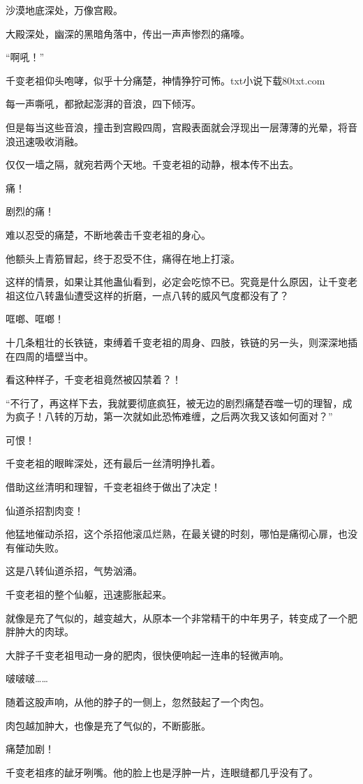 \begin{this_body}
沙漠地底深处，万像宫殿。

大殿深处，幽深的黑暗角落中，传出一声声惨烈的痛嚎。

“啊吼！”

千变老祖仰头咆哮，似乎十分痛楚，神情狰狞可怖。txt小说下载80txt.com

每一声嘶吼，都掀起澎湃的音浪，四下倾泻。

但是每当这些音浪，撞击到宫殿四周，宫殿表面就会浮现出一层薄薄的光晕，将音浪迅速吸收消融。

仅仅一墙之隔，就宛若两个天地。千变老祖的动静，根本传不出去。

痛！

剧烈的痛！

难以忍受的痛楚，不断地袭击千变老祖的身心。

他额头上青筋冒起，终于忍受不住，痛得在地上打滚。

这样的情景，如果让其他蛊仙看到，必定会吃惊不已。究竟是什么原因，让千变老祖这位八转蛊仙遭受这样的折磨，一点八转的威风气度都没有了？

哐啷、哐啷！

十几条粗壮的长铁链，束缚着千变老祖的周身、四肢，铁链的另一头，则深深地插在四周的墙壁当中。

看这种样子，千变老祖竟然被囚禁着？！

“不行了，再这样下去，我就要彻底疯狂，被无边的剧烈痛楚吞噬一切的理智，成为疯子！八转的万劫，第一次就如此恐怖难缠，之后两次我又该如何面对？”

可恨！

千变老祖的眼眸深处，还有最后一丝清明挣扎着。

借助这丝清明和理智，千变老祖终于做出了决定！

仙道杀招割肉变！

他猛地催动杀招，这个杀招他滚瓜烂熟，在最关键的时刻，哪怕是痛彻心扉，也没有催动失败。

这是八转仙道杀招，气势汹涌。

千变老祖的整个仙躯，迅速膨胀起来。

就像是充了气似的，越变越大，从原本一个非常精干的中年男子，转变成了一个肥胖肿大的肉球。

大胖子千变老祖甩动一身的肥肉，很快便响起一连串的轻微声响。

啵啵啵……

随着这股声响，从他的脖子的一侧上，忽然鼓起了一个肉包。

肉包越加肿大，也像是充了气似的，不断膨胀。

痛楚加剧！

千变老祖疼的龇牙咧嘴。他的脸上也是浮肿一片，连眼缝都几乎没有了。


\end{this_body}

